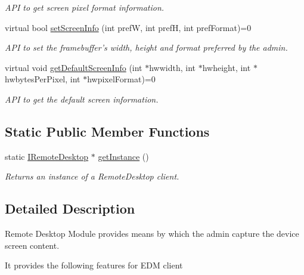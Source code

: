 \begin{DoxyCompactItemize}
\begin{DoxyCompactList}\small\item\em \-A\-P\-I to get screen pixel format information. \end{DoxyCompactList}\item 
virtual bool \hyperlink{classknoxremotedesktop_1_1IRemoteDesktop_aeb13652779ac87ce9de9a8155f6dc60b}{set\-Screen\-Info} (int pref\-W, int pref\-H, int pref\-Format)=0
\begin{DoxyCompactList}\small\item\em \-A\-P\-I to set the framebuffer's width, height and format preferred by the admin. \end{DoxyCompactList}\item 
virtual void \hyperlink{classknoxremotedesktop_1_1IRemoteDesktop_aafef444b0d8af3044e790932648cec3b}{get\-Default\-Screen\-Info} (int $\ast$hwwidth, int $\ast$hwheight, int $\ast$hwbytes\-Per\-Pixel, int $\ast$hwpixel\-Format)=0
\begin{DoxyCompactList}\small\item\em \-A\-P\-I to get the default screen information. \end{DoxyCompactList}\end{DoxyCompactItemize}
\subsection*{\-Static \-Public \-Member \-Functions}
\begin{DoxyCompactItemize}
\item 
static \hyperlink{classknoxremotedesktop_1_1IRemoteDesktop}{\-I\-Remote\-Desktop} $\ast$ \hyperlink{classknoxremotedesktop_1_1IRemoteDesktop_a86eefbec946d605470af069999763f74}{get\-Instance} ()
\begin{DoxyCompactList}\small\item\em \-Returns an instance of a \-Remote\-Desktop client. \end{DoxyCompactList}\end{DoxyCompactItemize}


\subsection{\-Detailed \-Description}
\-Remote \-Desktop \-Module provides means by which the admin capture the device screen content. 

\-It provides the following features for \-E\-D\-M client\par



